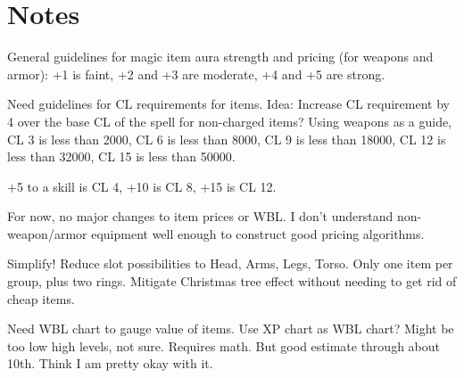 \chapter{Notes}

General guidelines for magic item aura strength and pricing (for weapons and armor): +1 is faint, +2 and +3 are moderate, +4 and +5 are strong.
\par Need guidelines for CL requirements for items. Idea: Increase CL requirement by 4 over the base CL of the spell for non-charged items? Using weapons as a guide, CL 3 is less than 2000, CL 6 is less than 8000, CL 9 is less than 18000, CL 12 is less than 32000, CL 15 is less than 50000.
\par +5 to a skill is CL 4, +10 is CL 8, +15 is CL 12.
\par For now, no major changes to item prices or WBL. I don't understand non-weapon/armor equipment well enough to construct good pricing algorithms.
\par Simplify! Reduce slot possibilities to Head, Arms, Legs, Torso. Only one item per group, plus two rings. Mitigate Christmas tree effect without needing to get rid of cheap items.
\par Need WBL chart to gauge value of items. Use XP chart as WBL chart? Might be too low high levels, not sure. Requires math. But good estimate through about 10th. Think I am pretty okay with it.